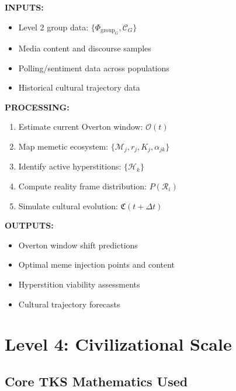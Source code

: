 \documentclass[11pt,twoside]{book}
\newcommand{\Cultural}{\mathfrak{C}}
\newcommand{\GroupFrac}{\Phi_{\mathrm{group}}}
\newcommand{\Overton}{\mathcal{O}}
\newcommand{\Memetic}{\mathcal{M}}
\newcommand{\Hyperstition}{\mathcal{H}}
\newcommand{\Cascade}{\mathcal{C}}
\begin{document}
\begin{tcolorbox}[colback=blue!5!white,colframe=blue!65!black,title=\textbf{Level 3 I/O Specification}]
\textbf{INPUTS:}
\begin{itemize}
    \item Level 2 group data: $\{\GroupFrac_G, \Cascade_G\}$
    \item Media content and discourse samples
    \item Polling/sentiment data across populations
    \item Historical cultural trajectory data
\end{itemize}

\textbf{PROCESSING:}
\begin{enumerate}
    \item Estimate current Overton window: $\Overton(t)$
    \item Map memetic ecosystem: $\{\Memetic_j, r_j, K_j, \alpha_{jk}\}$
    \item Identify active hyperstitions: $\{\Hyperstition_k\}$
    \item Compute reality frame distribution: $P(\mathcal{R}_i)$
    \item Simulate cultural evolution: $\Cultural(t + \Delta t)$
\end{enumerate}

\textbf{OUTPUTS:}
\begin{itemize}
    \item Overton window shift predictions
    \item Optimal meme injection points and content
    \item Hyperstition viability assessments
    \item Cultural trajectory forecasts
\end{itemize}
\end{tcolorbox}

\chapter{Level 4: Civilizational Scale}
\label{ch:level4-spec}

\section{Core TKS Mathematics Used}
\end{document}
